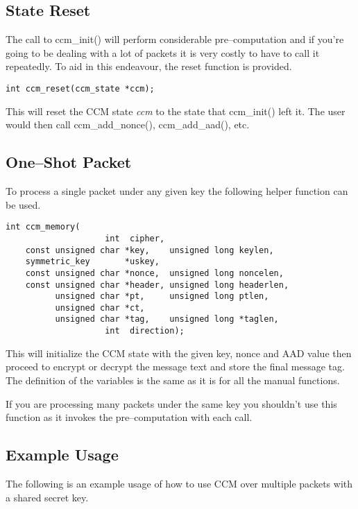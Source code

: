 \documentclass[synpaper]{book}
\begin{document}
\subsection{State Reset}
The call to ccm\_init() will perform considerable pre--computation and if you're going to be dealing with a lot of packets
it is very costly to have to call it repeatedly.  To aid in this endeavour, the reset function is provided.

\begin{verbatim}
int ccm_reset(ccm_state *ccm);
\end{verbatim}

This will reset the CCM state \textit{ccm} to the state that ccm\_init() left it.  The user would then call ccm\_add\_nonce(), ccm\_add\_aad(), etc.

\subsection{One--Shot Packet}
To process a single packet under any given key the following helper function can be used.

\begin{verbatim}
int ccm_memory(
                    int  cipher,
    const unsigned char *key,    unsigned long keylen,
    symmetric_key       *uskey,
    const unsigned char *nonce,  unsigned long noncelen,
    const unsigned char *header, unsigned long headerlen,
          unsigned char *pt,     unsigned long ptlen,
          unsigned char *ct,
          unsigned char *tag,    unsigned long *taglen,
                    int  direction);
\end{verbatim}

This will initialize the CCM state with the given key, nonce and AAD value then proceed to encrypt or decrypt the message text and store the final
message tag.  The definition of the variables is the same as it is for all the manual functions.

If you are processing many packets under the same key you shouldn't use this function as it invokes the pre--computation with each call.

\subsection{Example Usage}
The following is an example usage of how to use CCM over multiple packets with a shared secret key.
\end{document}
